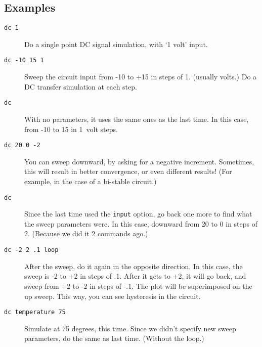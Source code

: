 \subsection{Examples}

\begin{description}

\item[{\tt dc 1}] Do a single point DC signal simulation, with {`1 volt'}
input.

\item[{\tt dc -10 15 1}] Sweep the circuit input from -10 to +15 in steps of
1.  (usually volts.)  Do a DC transfer simulation at each step.

\item[{\tt dc}] With no parameters, it uses the same ones as the last time.
In this case, from -10 to 15 in 1\ volt steps.

\item[{\tt dc 20 0 -2}] You can sweep downward, by asking for a negative
increment.  Sometimes, this will result in better convergence, or even
different results!  (For example, in the case of a bi-stable circuit.)


\item[{\tt dc}] Since the last time used the {\tt input} option, go back one
more to find what the sweep parameters were.  In this case, downward from 20
to 0 in steps of 2.  (Because we did it 2 commands ago.)

\item[{\tt dc -2 2 .1 loop}] After the sweep, do it again in the opposite
direction.  In this case, the sweep is -2 to +2 in steps of .1.  After it
gets to +2, it will go back, and sweep from +2 to -2 in steps of -.1.  The
plot will be superimposed on the up sweep.  This way, you can see hysteresis
in the circuit.

\item[{\tt dc temperature 75}] Simulate at 75 degrees, this time.  Since we
didn't specify new sweep parameters, do the same as last time.  (Without the
loop.)


\end{description}
